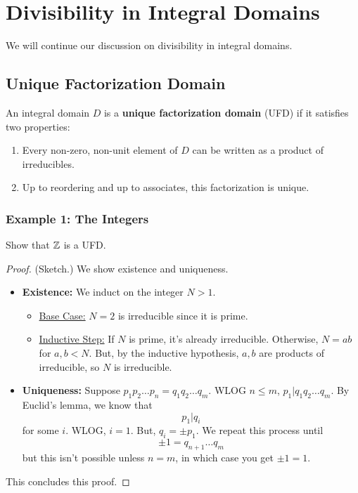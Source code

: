 \documentclass[letterpaper]{article}
\begin{document}
\section{Divisibility in Integral Domains}
We will continue our discussion on divisibility in integral domains.

\subsection{Unique Factorization Domain}
\begin{definition}{}{}
    An integral domain $D$ is a \textbf{unique factorization domain} (UFD) if it satisfies two properties: 
    \begin{enumerate}
        \item Every non-zero, non-unit element of $D$ can be written as a product of irreducibles. 
        \item Up to reordering and up to associates, this factorization is unique. 
    \end{enumerate}
\end{definition}

\subsubsection{Example 1: The Integers}
Show that $\mathbb{Z}$ is a UFD. 

\begin{mdframed}[]
    \begin{proof}
        (Sketch.) We show existence and uniqueness. 
        \begin{itemize}
            \item \textbf{Existence:} We induct on the integer $N > 1$. 
            \begin{itemize}
                \item \underline{Base Case:} $N = 2$ is irreducible since it is prime. 
                \item \underline{Inductive Step:} If $N$ is prime, it's already irreducible. Otherwise, $N = ab$ for $a, b < N$. But, by the inductive hypothesis, $a, b$ are products of irreducible, so $N$ is irreducible. 
            \end{itemize}

            \item \textbf{Uniqueness:} Suppose $p_1 p_2 \ldots p_n = q_1 q_2 \ldots q_m$. WLOG $n \leq m$, $p_1 | q_1 q_2 \ldots q_m$. By Euclid's lemma, we know that 
            \[p_1|q_i\]
            for some $i$. WLOG, $i = 1$. But, $q_i = \pm p_1$. We repeat this process until 
            \[\pm 1 = q_{n + 1} \ldots q_m\]
            but this isn't possible unless $n = m$, in which case you get $\pm 1 = 1$. 
        \end{itemize}
        This concludes this proof. 
    \end{proof}
\end{mdframed}
\end{document}
